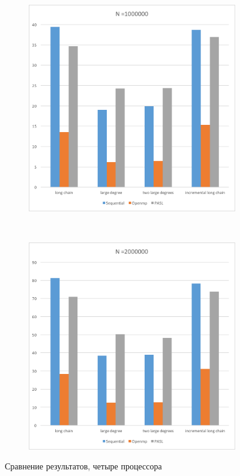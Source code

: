 \documentclass[specification,annotation,times]{itmo-student-thesis}
\begin{document}
\begin{figure}[!ht]
\begin{subfigure}[b]{0.45\textwidth}
\end{subfigure}\\
\begin{subfigure}[b]{0.45\textwidth}
    \includegraphics[width=\textwidth]{pic/results-4-c.png}
\end{subfigure}~~\begin{subfigure}[b]{0.45\textwidth}
    \includegraphics[width=\textwidth]{pic/results-4-d.png}
\end{subfigure}
\caption{Сравнение результатов, четыре процессора}\label{fig:results-comparison-4}
\end{figure}
\end{document}
